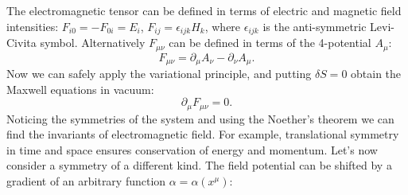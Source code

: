The electromagnetic tensor can be defined in terms of electric and magnetic field intensities: $F_{i0}=-F_{0i} = E_i$, $F_{ij} = \epsilon_{ijk}H_k$, where $\epsilon_{ijk}$ is the anti-symmetric Levi-Civita symbol. Alternatively $F_{\mu \nu}$ can be defined in terms of the 4-potential $A_{\mu}$:
 \begin{equation}
F_{\mu \nu} = \partial_{\mu}A_{\nu} - \partial_{\nu}A_{\mu}.
\end{equation}
Now we can safely apply the variational principle, and putting $\delta S=0$ obtain the Maxwell equations in vacuum:
 \begin{equation}
\partial_{\mu}F_{\mu \nu} = 0.
\end{equation}
Noticing the symmetries of the system and using the Noether's theorem\cite{Noether1918} we can find the invariants of electromagnetic field. For example, translational symmetry in time and space ensures conservation of energy and momentum. Let's now consider a symmetry of a different kind. The field potential can be shifted by a gradient of an arbitrary function $\alpha=\alpha(x^\mu)$:

